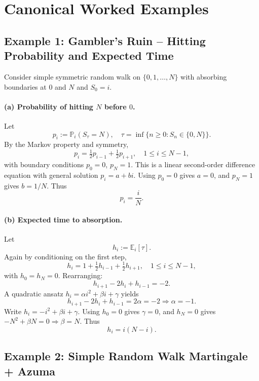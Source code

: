 \documentclass[answers,12pt,addpoints]{exam}
\begin{document}
\section*{Canonical Worked Examples}


\subsection*{Example 1: Gambler's Ruin – Hitting Probability and Expected Time}

Consider simple symmetric random walk on $\{0,1,\dots,N\}$ with absorbing boundaries at $0$ and $N$ and $S_0=i$.

\paragraph{(a) Probability of hitting $N$ before $0$.}
Let
\[
p_i := \mathbb{P}_i(S_\tau = N),\quad \tau = \inf\{n\ge0: S_n\in\{0,N\}\}.
\]
By the Markov property and symmetry,
\[
p_i = \tfrac12 p_{i-1} + \tfrac12 p_{i+1},\quad 1\le i\le N-1,
\]
with boundary conditions $p_0=0$, $p_N=1$.
This is a linear second-order difference equation with general solution $p_i = a+bi$. Using $p_0=0$ gives $a=0$, and $p_N=1$ gives $b=1/N$. Thus
\[
\boxed{p_i = \frac{i}{N}.}
\]

\paragraph{(b) Expected time to absorption.}
Let
\[
h_i := \mathbb{E}_i[\tau].
\]
Again by conditioning on the first step,
\[
h_i = 1 + \tfrac12 h_{i-1} + \tfrac12 h_{i+1},\quad 1\le i\le N-1,
\]
with $h_0=h_N=0$. Rearranging:
\[
h_{i+1} - 2h_i + h_{i-1} = -2.
\]
A quadratic ansatz $h_i = \alpha i^2 + \beta i + \gamma$ yields
\[
h_{i+1}-2h_i+h_{i-1} = 2\alpha = -2 \Rightarrow \alpha=-1.
\]
Write $h_i = -i^2 + \beta i + \gamma$. Using $h_0=0$ gives $\gamma=0$, and $h_N=0$ gives $-N^2 + \beta N=0 \Rightarrow \beta = N$. Thus
\[
\boxed{h_i = i(N-i).}
\]


\subsection*{Example 2: Simple Random Walk Martingale + Azuma}
\end{document}
